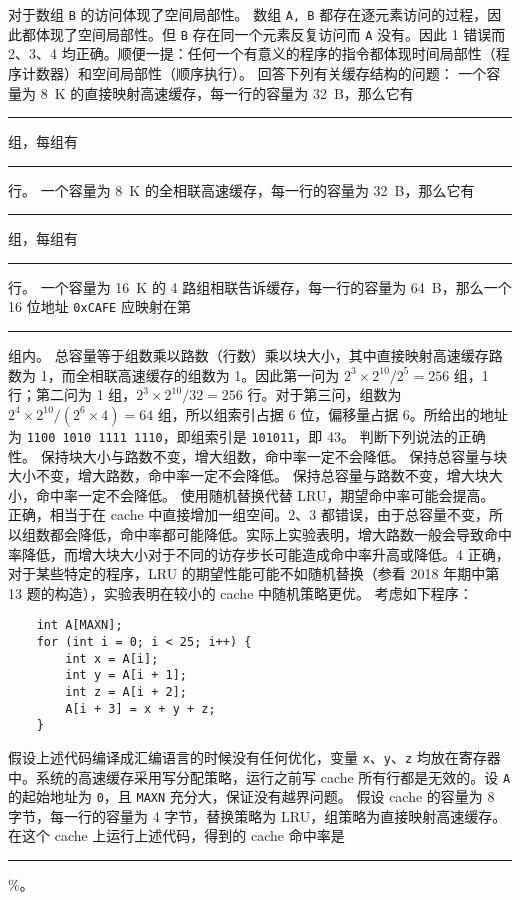 \begin{problems}
            \qn 对于数组 \verb|B| 的访问体现了空间局部性。
        \sol 数组 \verb|A, B| 都存在逐元素访问的过程，因此都体现了空间局部性。但 \verb|B| 存在同一个元素反复访问而 \verb|A| 没有。因此 1 错误而 2、3、4 均正确。顺便一提：任何一个有意义的程序的指令都体现时间局部性（程序计数器）和空间局部性（顺序执行）。
        \pro 回答下列有关缓存结构的问题：
            \qn 一个容量为 \SI{8}{K} 的直接映射高速缓存，每一行的容量为 \SI{32}{B}，那么它有 \rule{2.5cm}{0.25mm} 组，每组有 \rule{2.5cm}{0.25mm} 行。
            \qn 一个容量为 \SI{8}{K} 的全相联高速缓存，每一行的容量为 \SI{32}{B}，那么它有 \rule{2.5cm}{0.25mm} 组，每组有 \rule{2.5cm}{0.25mm} 行。
            \qn 一个容量为 \SI{16}{K} 的 4 路组相联告诉缓存，每一行的容量为 \SI{64}{B}，那么一个 16 位地址 \verb|0xCAFE| 应映射在第 \rule{2.5cm}{0.25mm} 组内。
        \sol 总容量等于组数乘以路数（行数）乘以块大小，其中直接映射高速缓存路数为 1，而全相联高速缓存的组数为 1。因此第一问为 $2^3 \times 2^10/2^5=256$ 组，1 行；第二问为 1 组，$2^3 \times 2^10/32=256$ 行。对于第三问，组数为 $2^4 \times 2^10/(2^6 \times 4)=64$ 组，所以组索引占据 6 位，偏移量占据 6。所给出的地址为 \verb|1100 1010 1111 1110|，即组索引是 \verb|101011|，即 43。
        \pro 判断下列说法的正确性。
            \qn 保持块大小与路数不变，增大组数，命中率一定不会降低。
            \qn 保持总容量与块大小不变，增大路数，命中率一定不会降低。
            \qn 保持总容量与路数不变，增大块大小，命中率一定不会降低。
            \qn 使用随机替换代替 LRU，期望命中率可能会提高。
         正确，相当于在 cache 中直接增加一组空间。2、3 都错误，由于总容量不变，所以组数都会降低，命中率都可能降低。实际上实验表明，增大路数一般会导致命中率降低，而增大块大小对于不同的访存步长可能造成命中率升高或降低。4 正确，对于某些特定的程序，LRU 的期望性能可能不如随机替换（参看 2018 年期中第 13 题的构造），实验表明在较小的 cache 中随机策略更优。
        \pro 考虑如下程序：
        \begin{verbatim}
    int A[MAXN];
    for (int i = 0; i < 25; i++) {
        int x = A[i];
        int y = A[i + 1];
        int z = A[i + 2];
        A[i + 3] = x + y + z;
    }
        \end{verbatim}
        假设上述代码编译成汇编语言的时候没有任何优化，变量 \verb|x|、\verb|y|、\verb|z| 均放在寄存器中。系统的高速缓存采用写分配策略，运行之前写 cache 所有行都是无效的。设 \verb|A| 的起始地址为 \verb|0|，且 \verb|MAXN| 充分大，保证没有越界问题。
        \qn 假设 cache 的容量为 8 字节，每一行的容量为 4 字节，替换策略为 LRU，组策略为直接映射高速缓存。在这个 cache 上运行上述代码，得到的 cache 命中率是 \rule{2.5cm}{0.25mm}\%。

\end{problems}
